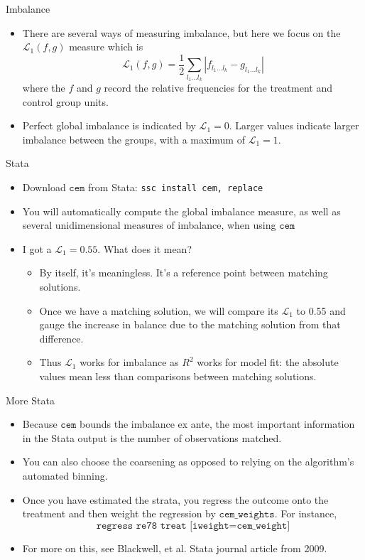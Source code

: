 \documentclass{beamer}
\begin{document}
\begin{frame}{Imbalance}
	
	\begin{itemize}
	\item There are several ways of measuring imbalance, but here we focus on the $\mathcal{L}_1(f,g)$ measure which is$$\mathcal{L}_1(f,g) = \frac{1}{2} \sum_{l_1 \dots l_k} | f_{l_1 \dots l_k} - g_{l_1 \dots l_k} |$$where the $f$ and $g$ record the relative frequencies for the treatment and control group units.
	\item Perfect global imbalance is indicated by $\mathcal{L}_1=0$.  Larger values indicate larger imbalance between the groups, with a maximum of $\mathcal{L}_1=1$. 
	\end{itemize}
\end{frame}

\begin{frame}{Stata}
	
	\begin{itemize}
	\item Download $\texttt{cem}$ from Stata:  \texttt{ssc install cem, replace}
	\item You will automatically compute the global imbalance measure, as well as several unidimensional measures of imbalance, when using $\texttt{cem}$
	\item I got a $\mathcal{L}_1=0.55$.  What does it mean?
		\begin{itemize}
		\item By itself, it's meaningless.  It's a reference point between matching solutions.
		\item Once we have a matching solution, we will compare its $\mathcal{L}_1$ to 0.55 and gauge the increase in balance due to the matching solution from that difference.
		\item Thus $\mathcal{L}_1$ works for imbalance as $R^2$ works for model fit: the absolute values mean less than comparisons between matching solutions.
		\end{itemize}
	\end{itemize}
	
\end{frame}

\begin{frame}{More Stata}
	
	\begin{itemize}
	\item Because $\texttt{cem}$ bounds the imbalance ex ante, the most important information in the Stata output is the number of observations matched.
	\item You can also choose the coarsening as opposed to relying on the algorithm's automated binning.  
	\item Once you have estimated the strata, you regress the outcome onto the treatment and then weight the regression by $\texttt{cem_weights}$.  For instance, $$\texttt{regress re78 treat [iweight=cem\_weight]}$$
	\item For more on this, see Blackwell, et al. Stata journal article from 2009.  
	\end{itemize}
\end{frame}
\end{document}
